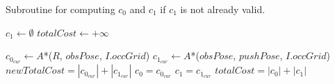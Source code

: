 \begin{algorithm}[H]

  \caption{Subroutine for computing $c_{0}$ and $c_{1}$ if $c_{1}$ is not already valid.}

  \label{alg:04-custom-observation-simple-compute01c1}

  \begin{algorithmic}[1]

      \State $c_{1} \gets \emptyset$
      \State $totalCost \gets +\infty$

        \State $c_{0_{cur}} \gets A$*($R$, $obsPose$, $I.occGrid$)
        \State $c_{1_{cur}} \gets A$*($obsPose$, $pushPose$, $I.occGrid$)
        \State $newTotalCost = |c_{0_{cur}}| + |c_{1_{cur}}|$
          \State $c_{0} = c_{0_{cur}}$
          \State $c_{1} = c_{1_{cur}}$
          \State $totalCost = |c_{0}| + |c_{1}|$
        \EndIf
      \EndFor
    \EndProcedure

  \end{algorithmic}
\end{algorithm}
